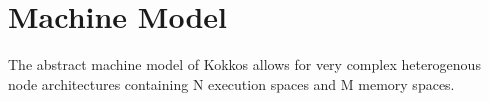 
\chapter{Machine Model}

The abstract machine model of Kokkos allows for very complex heterogenous node architectures containing N execution spaces and M memory spaces.

